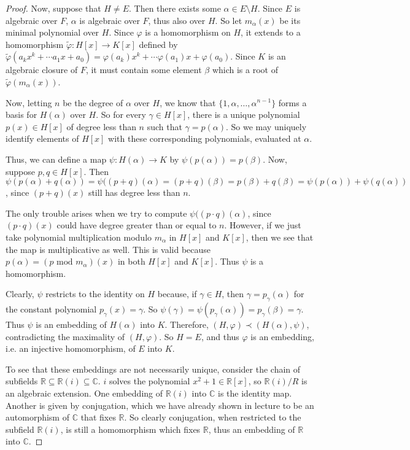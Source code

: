 \documentclass[10pt]{article}
\begin{document}
\begin{enumerate}
\begin{proof}
Now, suppose that $H \neq E$.  Then there exists some $\alpha \in E \setminus H$.  Since $E$ is algebraic over $F$, $\alpha$ is algebraic over $F$, thus also over $H$.  So let $m_{\alpha}(x)$ be its minimal polynomial over $H$.  Since $\varphi$ is a homomorphism on $H$, it extends to a homomorphism $\widetilde{\varphi}:H[x] \rightarrow K[x]$ defined by $\widetilde{\varphi}(a_k x^k + \cdots a_1 x + a_0) = \varphi(a_k)x^k + \cdots \varphi(a_1)x + \varphi(a_0)$.  Since $K$ is an algebraic closure of $F$, it must contain some element $\beta$ which is a root of $\widetilde{\varphi}(m_{\alpha}(x))$.

Now, letting $n$ be the degree of $\alpha$ over $H$, we know that $\{ 1, \alpha, \dots, \alpha^{n-1} \}$ forms a basis for $H(\alpha)$ over $H$.  So for every $\gamma \in H[x]$, there is a unique polynomial $p(x) \in H[x]$ of degree less than $n$ such that $\gamma = p(\alpha)$.  So we may uniquely identify elements of $H[x]$ with these corresponding polynomials, evaluated at $\alpha$.

Thus, we can define a map $\psi:H(\alpha) \rightarrow K$ by $\psi(p(\alpha)) = p(\beta)$.  Now, suppose $p, q \in H[x]$.  Then $\psi(p(\alpha) + q(\alpha)) = \psi((p+q)(\alpha) = (p+q)(\beta) = p(\beta) + q(\beta) = \psi(p(\alpha)) + \psi(q(\alpha))$, since $(p+q)(x)$ still has degree less than $n$.

The only trouble arises when we try to compute $\psi( (p\cdot q)(\alpha)$, since $(p \cdot q)(x)$ could have degree greater than or equal to $n$.  However, if we just take polynomial multiplication modulo $m_{\alpha}$ in $H[x]$ and $K[x]$, then we see that the map is multiplicative as well.  This is valid because $p(\alpha) = (p \text{ mod } m_{\alpha})(x)$ in both $H[x]$ and $K[x]$.  Thus $\psi$ is a homomorphism.

Clearly, $\psi$ restricts to the identity on $H$ because, if $\gamma \in H$, then $\gamma = p_{\gamma}(\alpha)$ for the constant polynomial $p_{\gamma}(x) = \gamma$.  So $\psi(\gamma) = \psi(p_{\gamma}(\alpha)) = p_{\gamma}(\beta) = \gamma$.  Thus $\psi$ is an embedding of $H(\alpha)$ into $K$.  Therefore, $(H,\varphi) \prec (H(\alpha),\psi)$, contradicting the maximality of $(H, \varphi)$.  So $H = E$, and thus $\varphi$ is an embedding, i.e. an injective homomorphism, of $E$ into $K$.

To see that these embeddings are not necessarily unique, consider the chain of subfields $\mathbb{R} \subseteq \mathbb{R}(i) \subseteq \mathbb{C}$.  $i$ solves the polynomial $x^2 + 1 \in \mathbb{R}[x]$, so $\mathbb{R}(i) / R$ is an algebraic extension.  One embedding of $\mathbb{R}(i)$ into $\mathbb{C}$ is the identity map.  Another is given by conjugation, which we have already shown in lecture to be an automorphism of $\mathbb{C}$ that fixes $\mathbb{R}$.  So clearly conjugation, when restricted to the subfield $\mathbb{R}(i)$, is still a homomorphism which fixes $\mathbb{R}$, thus an embedding of $\mathbb{R}$ into $\mathbb{C}$.


\end{proof}
\end{enumerate}
\end{document}
